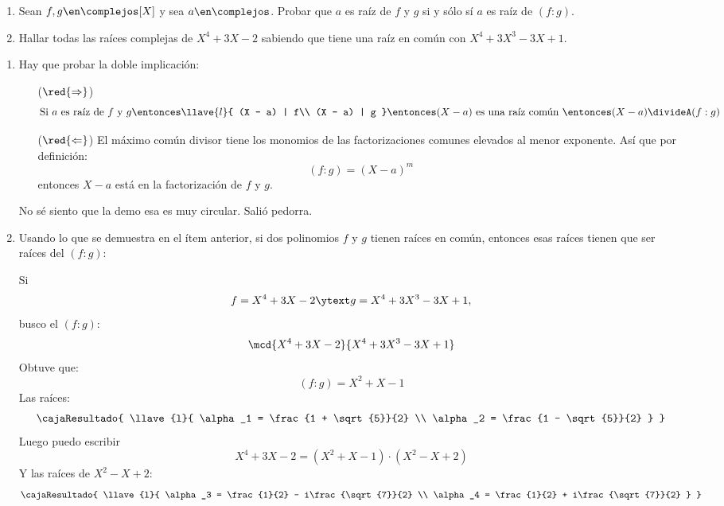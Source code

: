 \begin{enunciado}{\ejercicio}
  \begin{enumerate}[label=\roman*)]
    \item Sean $f,g \en \complejos[X]$ y sea $a\en \complejos$. Probar que $a$ es raíz de $f$ y $g$ si y sólo sí $a$ es raíz de
          $(f:g)$.

    \item Hallar todas las raíces complejas de $X^4 + 3X - 2$ sabiendo
          que tiene una raíz en común con ${X^4 + 3X^3 -3X +1}$.
  \end{enumerate}
\end{enunciado}

\begin{enumerate}[label=\roman*)]
  \item Hay que probar la doble implicación:
        \begin{itemize}
          \item[($\red{\Rightarrow}$)]
                $$
                  \text{Si $a$ es raíz de $f$ y $g$}
                  \entonces
                  \llave{l}{
                    (X - a) | f\\
                    (X - a) | g
                  }
                  \entonces
                  (X - a) \text{ es una raíz común }
                  \entonces
                  (X - a) \divideA (f:g)
                $$
          \item[($\red{\Leftarrow}$)]
                El máximo común divisor tiene los monomios de las factorizaciones comunes elevados al menor exponente.
                Así que por definición:
                $$
                  (f:g) = (X - a)^m
                $$
                entonces $X-a$ está en la factorización de $f$ y $g$.
        \end{itemize}
        No sé siento que la demo esa es muy circular. Salió pedorra.

  \item  Usando lo que se demuestra en el ítem anterior, si dos polinomios $f$ y $g$ tienen
        raíces en común, entonces esas raíces tienen que ser raíces del $(f:g)$:

        Si
        $$
          f = X^4 + 3X - 2
          \ytext
          g = X^4 + 3X^3 -3X +1,
        $$
        busco el $(f:g)$:
        $$
          \mcd{X^4 + 3X - 2}{X^4 + 3X^3 -3X +1}
        $$
        Obtuve que:
        $$
          (f:g) = X^2 + X - 1
        $$
        Las raíces:
        $$
          \cajaResultado{
            \llave{l}{
              \alpha_1 = \frac{1 + \sqrt{5}}{2} \\
              \alpha_2 = \frac{1 - \sqrt{5}}{2}
            }
          }
        $$
        Luego puedo escribir
        $$
          X^4 + 3X - 2 = (X^2 + X - 1) \cdot (X^2 - X + 2)
        $$
        Y las raíces de $X^2 - X + 2$:
        $$
          \cajaResultado{
            \llave{l}{
              \alpha_3 = \frac{1}{2} - i\frac{\sqrt{7}}{2} \\
              \alpha_4 = \frac{1}{2} + i\frac{\sqrt{7}}{2}
            }
          }
        $$
\end{enumerate}

\begin{aportes}
  \item {}
\end{aportes}
